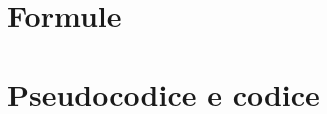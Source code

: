 \documentclass[a4paper,12pt]{book}
\begin{document}
\clearpage{\pagestyle{plain}\cleardoublepage}
\chapter{Formule} 
\label{chapter:formule} 
 

\clearpage{\pagestyle{plain}\cleardoublepage}
\chapter{Pseudocodice e codice} 
\label{chapter:codice} 
 

\clearpage{\pagestyle{plain}\cleardoublepage}

\nocite{*}

%
\end{document}
